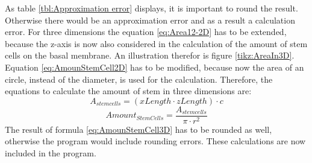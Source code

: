 As table \ref{tbl:Approximation error} displays, it is important to round the result. Otherwise there would be an approximation error and as a result a calculation error. \newline
For three dimensions the equation \ref{eq:Area12-2D} has to be extended, because the z-axis is now also considered in the calculation of the amount of stem cells on the basal membrane. An illustration therefor is figure \ref{tikz:AreaIn3D}. Equation \ref{eq:AmounStemCell2D} has to be modified, because now the area of an circle, instead of the diameter, is used for the calculation. Therefore, the equations to calculate the amount of stem in three dimensions are:
\begin{equation}\label{eq:Area12-3D}
A_{stem cells} = (xLength \cdot zLength) \cdot c
\end{equation}
\begin{equation}\label{eq:AmounStemCell3D}
Amount_{StemCells} = \dfrac{A_{stem cells}}{\pi \cdot r^{2}} 
\end{equation}
The result of formula \ref{eq:AmounStemCell3D} has to be rounded as well, otherwise the program would include rounding errors. 
These calculations are now included in the program.


